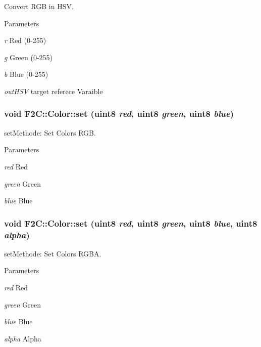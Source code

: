 Convert RGB in HSV. 
\begin{DoxyParams}{Parameters}
\item[{\em r}]Red (0-\/255) \item[{\em g}]Green (0-\/255) \item[{\em b}]Blue (0-\/255) \item[{\em outHSV}]target referece Varaible \end{DoxyParams}
\hypertarget{class_f2_c_1_1_color_ad7693b2f5f436dfad284165be66bd970}{
\subsubsection[{set}]{\setlength{\rightskip}{0pt plus 5cm}void F2C::Color::set ({\bf uint8} {\em red}, \/  {\bf uint8} {\em green}, \/  {\bf uint8} {\em blue})}}
\label{class_f2_c_1_1_color_ad7693b2f5f436dfad284165be66bd970}


setMethode: Set Colors RGB. 
\begin{DoxyParams}{Parameters}
\item[{\em red}]Red \item[{\em green}]Green \item[{\em blue}]Blue \end{DoxyParams}
\hypertarget{class_f2_c_1_1_color_a1440442aaec6a23b2a742b24716ad45b}{
\subsubsection[{set}]{\setlength{\rightskip}{0pt plus 5cm}void F2C::Color::set ({\bf uint8} {\em red}, \/  {\bf uint8} {\em green}, \/  {\bf uint8} {\em blue}, \/  {\bf uint8} {\em alpha})}}
\label{class_f2_c_1_1_color_a1440442aaec6a23b2a742b24716ad45b}


setMethode: Set Colors RGBA. 
\begin{DoxyParams}{Parameters}
\item[{\em red}]Red \item[{\em green}]Green \item[{\em blue}]Blue \item[{\em alpha}]Alpha \end{DoxyParams}

